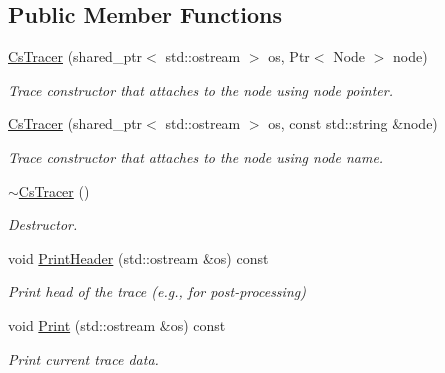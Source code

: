 \subsection*{Public Member Functions}
\begin{DoxyCompactItemize}
\item 
\hyperlink{classns3_1_1ndn_1_1CsTracer_a82b1a01698336e0e86a3bc2c8e3b25f8}{Cs\+Tracer} (shared\+\_\+ptr$<$ std\+::ostream $>$ os, Ptr$<$ Node $>$ node)
\begin{DoxyCompactList}\small\item\em Trace constructor that attaches to the node using node pointer. \end{DoxyCompactList}\item 
\hyperlink{classns3_1_1ndn_1_1CsTracer_a11ef87b51e18ecf1c19ab62e50d51e78}{Cs\+Tracer} (shared\+\_\+ptr$<$ std\+::ostream $>$ os, const std\+::string \&node)
\begin{DoxyCompactList}\small\item\em Trace constructor that attaches to the node using node name. \end{DoxyCompactList}\item 
\hyperlink{classns3_1_1ndn_1_1CsTracer_a8fded13daa5df4b25b4cd283a02ee0c8}{$\sim$\+Cs\+Tracer} ()\hypertarget{classns3_1_1ndn_1_1CsTracer_a8fded13daa5df4b25b4cd283a02ee0c8}{}\label{classns3_1_1ndn_1_1CsTracer_a8fded13daa5df4b25b4cd283a02ee0c8}

\begin{DoxyCompactList}\small\item\em Destructor. \end{DoxyCompactList}\item 
void \hyperlink{classns3_1_1ndn_1_1CsTracer_ab7237564ed00c56ed9ed883c2850da8d}{Print\+Header} (std\+::ostream \&os) const
\begin{DoxyCompactList}\small\item\em Print head of the trace (e.\+g., for post-\/processing) \end{DoxyCompactList}\item 
void \hyperlink{classns3_1_1ndn_1_1CsTracer_a9aa2737002c31648600733aed4841f2a}{Print} (std\+::ostream \&os) const
\begin{DoxyCompactList}\small\item\em Print current trace data. \end{DoxyCompactList}\end{DoxyCompactItemize}
